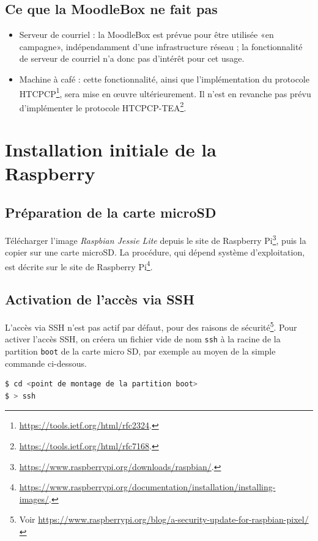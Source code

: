 \documentclass[11pt]{article}
\begin{document}
\subsection{Ce que la MoodleBox ne fait pas}

\begin{itemize}
\item Serveur de courriel : la MoodleBox est prévue pour être utilisée «en campagne», indépendamment d'une infrastructure réseau ; la fonctionnalité de serveur de courriel n'a donc pas d'intérêt pour cet usage.
\item Machine à café : cette fonctionnalité, ainsi que l'implémentation du protocole HTCPCP\footnote{\url{https://tools.ietf.org/html/rfc2324}.}, sera mise en œuvre ultérieurement. Il n'est en revanche pas prévu d'implémenter le protocole HTCPCP-TEA\footnote{\url{https://tools.ietf.org/html/rfc7168}.}.
\end{itemize}

\section{Installation initiale de la Raspberry}

\subsection{Préparation de la carte microSD}

Télécharger l'image \emph{Raspbian Jessie Lite} depuis le site de Raspberry Pi\footnote{\url{https://www.raspberrypi.org/downloads/raspbian/}.}, puis la copier sur une carte microSD. La procédure, qui dépend système d'exploitation, est décrite sur le site de Raspberry Pi\footnote{\url{https://www.raspberrypi.org/documentation/installation/installing-images/}.}.

\subsection{Activation de l'accès via SSH}

L'accès via SSH n'est pas actif par défaut, pour des raisons de sécurité\footnote{Voir \url{https://www.raspberrypi.org/blog/a-security-update-for-raspbian-pixel/}}. Pour activer l'accès SSH, on créera un fichier vide de nom \lstinline{ssh} à la racine de la partition \lstinline{boot} de la carte micro SD, par exemple au moyen de la simple commande ci-dessous.

\begin{lstlisting}[language=bash]
$ cd <point de montage de la partition boot>
$ > ssh
\end{lstlisting}
\end{document}
